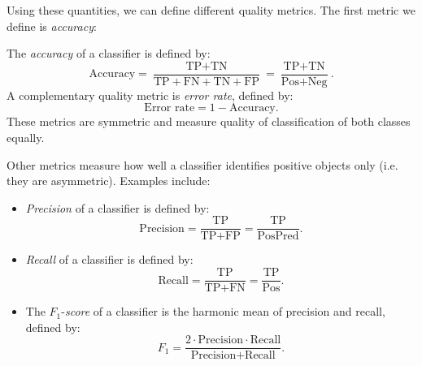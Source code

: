 Using these quantities, we can define different quality metrics. The first metric we define is \textit{accuracy}:

\begin{framedef}
The \textit{accuracy} of a classifier is defined by:
\begin{equation*}
\text{Accuracy} = \frac{\text{TP} + \text{TN}}{\text{TP} + \text{FN} + \text{TN} + \text{FP}} = \frac{\text{TP} + \text{TN}}{\text{Pos} + \text{Neg}}.
\end{equation*}
A complementary quality metric is \textit{error rate}, defined by:
\begin{equation*}
\text{Error rate} = 1 - \text{Accuracy}.
\end{equation*}
These metrics are symmetric and measure quality of classification of both classes equally.
\end{framedef}




\newpage
Other metrics measure how well a classifier identifies positive objects only (i.e. they are asymmetric). Examples include:
\begin{framedef}
\begin{itemize}
\item \textit{Precision} of a classifier is defined by:
\begin{equation*}
\text{Precision} = \frac{\text{TP}}{\text{TP} + \text{FP}} = \frac{\text{TP}}{\text{PosPred}}.
\end{equation*}
\item \textit{Recall} of a classifier is defined by:
\begin{equation*}
\text{Recall} = \frac{\text{TP}}{\text{TP} + \text{FN}} = \frac{\text{TP}}{\text{Pos}}.
\end{equation*}
\item The $F_1$-\textit{score} of a classifier is the harmonic mean of precision and recall, defined by:
\begin{equation*}
F_1 = \frac{2 \cdot \text{Precision} \cdot \text{Recall}}{\text{Precision} + \text{Recall}}.
\end{equation*}
\end{itemize}
\end{framedef}


